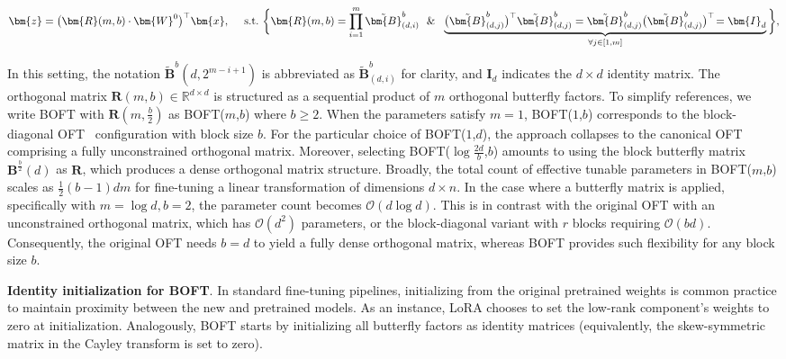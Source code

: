 \begin{equation}
    \begin{aligned}\nonumber
    \bm{z}=\big(\bm{R}(m,b)\cdot\bm{W}^0\big)^\top\bm{x},~~~~\text{s.t.}~\bigg{\{}\bm{R}(m,b)=\prod_{i=1}^m \tilde{\bm{B}}^b_{(d,i)}~~\&~~\underbrace{\big(\tilde{\bm{B}}^b_{(d,j)}\big)^\top\tilde{\bm{B}}^b_{(d,j)}=\tilde{\bm{B}}^b_{(d,j)}\big(\tilde{\bm{B}}^b_{(d,j)}\big)^\top\!=\bm{I}_d}_{\forall j\in [1, m]}\bigg{\}},
    \end{aligned}
\end{equation}

In this setting, the notation $\tilde{\bm{B}}^b(d,2^{m - i+1})$ is abbreviated as $\tilde{\bm{B}}^b_{(d,i)}$ for clarity, and $\bm{I}_d$ indicates the $d \times d$ identity matrix. The orthogonal matrix $\bm{R}(m,b)\in\mathbb{R}^{d\times d}$ is structured as a sequential product of $m$ orthogonal butterfly factors. To simplify references, we write BOFT with $\bm{R}(m,\frac{b}{2})$ as BOFT($m$,$b$) where $b\geq 2$. When the parameters satisfy $m=1$, BOFT($1$,$b$) corresponds to the block-diagonal OFT~\cite{qiu2023controlling} configuration with block size $b$. For the particular choice of BOFT($1$,$d$), the approach collapses to the canonical OFT~\cite{qiu2023controlling} comprising a fully unconstrained orthogonal matrix. Moreover, selecting BOFT($\log \frac{2d}{b}$,$b$) amounts to using the block butterfly matrix $\bm{B}^{\frac{b}{2}}(d)$ as $\bm{R}$, which produces a dense orthogonal matrix structure. Broadly, the total count of effective tunable parameters in BOFT($m$,$b$) scales as $\frac{1}{2}(b-1)dm$ for fine-tuning a linear transformation of dimensions $d\times n$. In the case where a butterfly matrix is applied, specifically with $m=\log d, b=2$, the parameter count becomes $\mathcal{O}(d\log d)$. This is in contrast with the original OFT with an unconstrained orthogonal matrix, which has $\mathcal{O}(d^2)$ parameters, or the block-diagonal variant with $r$ blocks requiring $\mathcal{O}(bd)$. Consequently, the original OFT needs $b=d$ to yield a fully dense orthogonal matrix, whereas BOFT provides such flexibility for any block size $b$.

\textbf{Identity initialization for BOFT}. In standard fine-tuning pipelines, initializing from the original pretrained weights is common practice to maintain proximity between the new and pretrained models. As an instance, LoRA chooses to set the low-rank component's weights to zero at initialization. Analogously, BOFT starts by initializing all butterfly factors as identity matrices (equivalently, the skew-symmetric matrix in the Cayley transform is set to zero).

